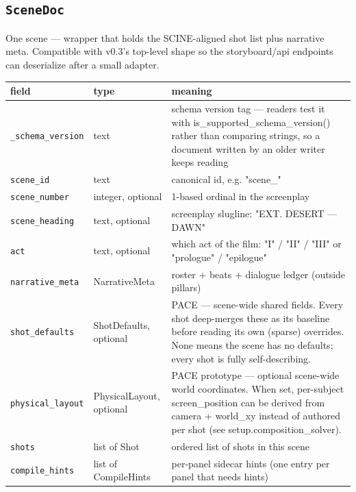 \subsection*{\texttt{SceneDoc}}
\noindent One scene ---\allowbreak{} wrapper that holds the SCINE-aligned shot list plus narrative meta. Compatible with v0.3's top-level shape so the storyboard/\allowbreak{}api endpoints can deserialize after a small adapter.

\begin{longtable}{@{}R{0.24\textwidth}R{0.21\textwidth}R{0.49\textwidth}@{}}
\toprule \textbf{field} & \textbf{type} & \textbf{meaning} \\ \midrule
\endhead
\texttt{\_\allowbreak schema\_\allowbreak version} & text & schema version tag ---\allowbreak{} readers test it with is\_\allowbreak supported\_\allowbreak schema\_\allowbreak version() rather than comparing strings, so a document written by an older writer keeps reading \\
\texttt{scene\_\allowbreak id} & text & canonical id, e.g. "scene\_" \\
\texttt{scene\_\allowbreak number} & integer, optional & 1-based ordinal in the screenplay \\
\texttt{scene\_\allowbreak heading} & text, optional & screenplay slugline: "EXT. DESERT ---\allowbreak{} DAWN" \\
\texttt{act} & text, optional & which act of the film: "I" /\allowbreak{} "II" /\allowbreak{} "III" or "prologue" /\allowbreak{} "epilogue" \\
\texttt{narrative\_\allowbreak meta} & NarrativeMeta & roster + beats + dialogue ledger (outside pillars) \\
\texttt{shot\_\allowbreak defaults} & ShotDefaults, optional & PACE ---\allowbreak{} scene-wide shared fields. Every shot deep-merges these as its baseline before reading its own (sparse) overrides. None means the scene has no defaults; every shot is fully self-describing. \\
\texttt{physical\_\allowbreak layout} & PhysicalLayout, optional & PACE prototype ---\allowbreak{} optional scene-wide world coordinates. When set, per-subject screen\_\allowbreak position can be derived from camera + world\_\allowbreak xy instead of authored per shot (see setup.composition\_\allowbreak solver). \\
\texttt{shots} & list of Shot & ordered list of shots in this scene \\
\texttt{compile\_\allowbreak hints} & list of CompileHints & per-panel sidecar hints (one entry per panel that needs hints) \\

\end{longtable}
